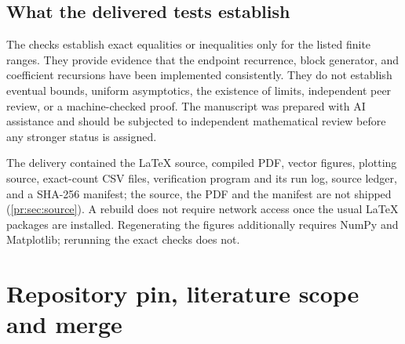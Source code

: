 \documentclass[11pt,a4paper]{article}
\theoremstyle{definition}\newaliascnt{definition}{theorem}
\theoremstyle{remark}\newaliascnt{remark}{theorem}
\begin{document}
\subsection{What the delivered tests establish}
The checks establish exact equalities or inequalities only for the listed
finite ranges. They provide evidence that the endpoint recurrence, block
generator, and coefficient recursions have been implemented consistently.
They do not establish eventual bounds, uniform asymptotics, the existence of
limits, independent peer review, or a machine-checked proof. The manuscript
was prepared with AI assistance and should be subjected to independent
mathematical review before any stronger status is assigned.

The delivery contained the \LaTeX{} source, compiled PDF, vector figures,
plotting source, exact-count CSV files, verification program and its run log,
source ledger, and a SHA-256 manifest; the source, the PDF and the manifest
are not shipped (\cref{pr:sec:source}). A rebuild does not require network
access once the usual \LaTeX{} packages are installed. Regenerating the
figures additionally requires NumPy and Matplotlib; rerunning the exact
checks does not.

\section{Repository pin, literature scope and merge}
\label{pr:sec:provenance}
\end{document}
